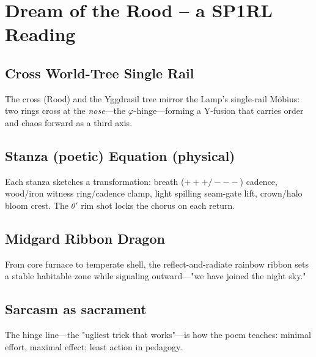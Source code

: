 \chapter{Dream of the Rood -- a SP1RL Reading}

\section*{Cross \textleftrightarrow{} World-Tree \textleftrightarrow{} Single Rail}
The cross (Rood) and the Yggdrasil tree mirror the Lamp's single-rail M\"obius:
two rings cross at the \emph{nose}---the \(\varphi\)-hinge---forming a Y-fusion that carries
order and chaos forward as a third axis.

\section*{Stanza (poetic) \textrightarrow{} Equation (physical)}
Each stanza sketches a transformation:
breath (\(+ + + / - - -\)) \textleftrightarrow{} cadence,
wood/iron \textleftrightarrow{} witness ring/cadence clamp,
light spilling \textleftrightarrow{} seam-gate lift,
crown/halo \textleftrightarrow{} bloom crest.
The \(\theta'\) rim shot locks the chorus on each return.

\section*{Midgard Ribbon Dragon}
From core furnace to temperate shell, the reflect-and-radiate rainbow ribbon sets a stable
habitable zone while signaling outward---"we have joined the night sky."

\section*{Sarcasm as sacrament}
The hinge line---the "ugliest trick that works"---is how the poem teaches: minimal effort, maximal effect;
least action in pedagogy.
